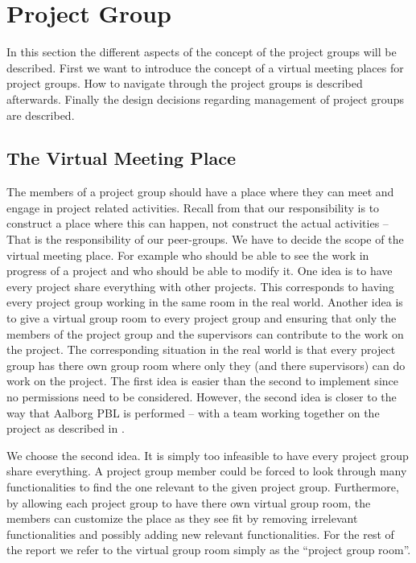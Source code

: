 \section{Project Group}
\label{sec:projectgroup}
In this section the different aspects of the concept of the project groups will be described.
First we want to introduce the concept of a virtual meeting places for project groups.
How to navigate through the project groups is described afterwards.
Finally the design decisions regarding management of project groups are described.

\subsection{The Virtual Meeting Place}
The members of a project group should have a place where they can meet and engage in project related activities.
Recall from  that our responsibility is to construct a place where this can happen, not construct the actual activities -- That is the responsibility of our peer-groups.
We have to decide the scope of the virtual meeting place.
For example who should be able to see the work in progress of a project and who should be able to modify it.
One idea is to have every project share everything with other projects.
This corresponds to having every project group working in the same room in the real world.
Another idea is to give a virtual group room to every project group and ensuring that only the members of the project group and the supervisors can contribute to the work on the project.
The corresponding situation in the real world is that every project group has there own group room where only they (and there supervisors) can do work on the project.
The first idea is easier than the second to implement since no permissions need to be considered.
However, the second idea is closer to the way that Aalborg PBL is performed -- with a team working together on the project as described in .

We choose the second idea.
It is simply too infeasible to have every project group share everything.
A project group member could be forced to look through many functionalities to find the one relevant to the given project group.
Furthermore, by allowing each project group to have there own virtual group room, the members can customize the place as they see fit by removing irrelevant functionalities and possibly adding new relevant functionalities.
For the rest of the report we refer to the virtual group room simply as the ``project group room''.

